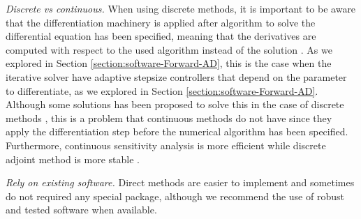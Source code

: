 \vspace{5px}
\noindent\textit{Discrete vs continuous. }
When using discrete methods, it is important to be aware that the differentiation machinery is applied after algorithm to solve the differential equation has been specified, meaning that the derivatives are computed with respect to the used algorithm instead of the solution \cite{Eberhard_Bischof_1996}.
As we explored in Section \ref{section:software-Forward-AD}, this is the case when the iterative solver have adaptive stepsize controllers that depend on the parameter to differentiate, as we explored in Section \ref{section:software-Forward-AD}.
Although some solutions has been proposed to solve this in the case of discrete methods \cite{Eberhard_Bischof_1996}, this is a problem that continuous methods do not have since they apply the differentiation step before the numerical algorithm has been specified. 
Furthermore, continuous sensitivity analysis is more efficient while discrete adjoint method is more stable \cite{rackauckas2020universal}.

\vspace{5px}
\noindent\textit{Rely on existing software. }
Direct methods are easier to implement and sometimes do not required any special package, although we recommend the use of robust and tested software when available. 




